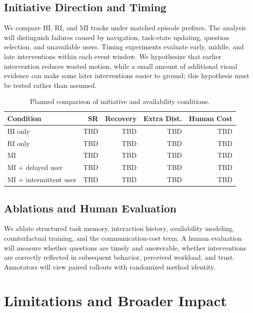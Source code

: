 \documentclass[10pt]{article}
\begin{document}
\subsection{Initiative Direction and Timing}

We compare HI, RI, and MI tracks under matched episode prefixes. The analysis
will distinguish failures caused by navigation, task-state updating, question
selection, and unavailable users. Timing experiments evaluate early, middle,
and late interventions within each event window. We hypothesize that earlier
intervention reduces wasted motion, while a small amount of additional visual
evidence can make some later interventions easier to ground; this hypothesis
must be tested rather than assumed.

\begin{table}[t]
\centering
\small
\begin{tabular}{lrrrr}
\toprule
\textbf{Condition} & \textbf{SR} & \textbf{Recovery} &
\textbf{Extra Dist.} & \textbf{Human Cost}\\
\midrule
HI only & TBD & TBD & TBD & TBD\\
RI only & TBD & TBD & TBD & TBD\\
MI & TBD & TBD & TBD & TBD\\
MI + delayed user & TBD & TBD & TBD & TBD\\
MI + intermittent user & TBD & TBD & TBD & TBD\\
\bottomrule
\end{tabular}
\caption{Planned comparison of initiative and availability conditions.}
\label{tab:initiative}
\end{table}

\subsection{Ablations and Human Evaluation}

We ablate structured task memory, interaction history, availability modeling,
counterfactual training, and the communication-cost term. A human evaluation
will measure whether questions are timely and answerable, whether interventions
are correctly reflected in subsequent behavior, perceived workload, and trust.
Annotators will view paired rollouts with randomized method identity.

\section{Limitations and Broader Impact}
\label{sec:limitations}
\end{document}
